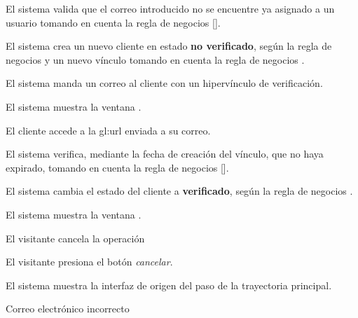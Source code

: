 {\begin{trayectoriaPrincipal}
    \item El sistema valida que el correo introducido no se encuentre ya asignado
      a un usuario tomando en cuenta la regla de negocios
       [].

    \item El sistema crea un nuevo cliente en estado \textbf{no verificado},
      según la regla de negocios  y un nuevo
      vínculo tomando en cuenta la regla de negocios
      .

    \item El sistema manda un correo al cliente con un hipervínculo de
      verificación.

    \item El sistema muestra la ventana
      .

    \item El cliente accede a la \gls{gl:url} enviada a su correo.

    \item El sistema verifica, mediante la fecha de creación del vínculo, que no
      haya expirado, tomando en cuenta la regla de negocios
      [].

    \item El sistema cambia el estado del cliente a \textbf{verificado},
      según la regla de negocios .

    \item El sistema muestra la ventana
      .

  \end{trayectoriaPrincipal}

  \begin{trayectoriaAlternativa}[ta:cancelar]
    {El visitante cancela la operación}

    \item El visitante presiona el botón \textit{cancelar}.

    \item El sistema muestra la interfaz de origen del paso
       de la trayectoria principal.

  \end{trayectoriaAlternativa}

  \begin{trayectoriaAlternativa}
    {Correo electrónico incorrecto}


\end{trayectoriaAlternativa}}

